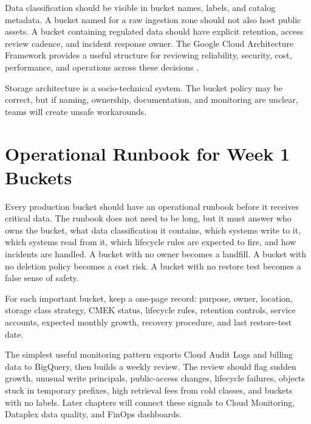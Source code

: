 Data classification should be visible in bucket names, labels, and catalog metadata. A bucket named for a raw ingestion zone should not also host public assets. A bucket containing regulated data should have explicit retention, access review cadence, and incident response owner. The Google Cloud Architecture Framework provides a useful structure for reviewing reliability, security, cost, performance, and operations across these decisions \cite{googlecloudarchitectureframework}.

\begin{notebox}
Storage architecture is a socio-technical system. The bucket policy may be correct, but if naming, ownership, documentation, and monitoring are unclear, teams will create unsafe workarounds.
\end{notebox}

\section{Operational Runbook for Week 1 Buckets}
Every production bucket should have an operational runbook before it receives critical data. The runbook does not need to be long, but it must answer who owns the bucket, what data classification it contains, which systems write to it, which systems read from it, which lifecycle rules are expected to fire, and how incidents are handled. A bucket with no owner becomes a landfill. A bucket with no deletion policy becomes a cost risk. A bucket with no restore test becomes a false sense of safety.

\begin{tipbox}
For each important bucket, keep a one-page record: purpose, owner, location, storage class strategy, CMEK status, lifecycle rules, retention controls, service accounts, expected monthly growth, recovery procedure, and last restore-test date.
\end{tipbox}

The simplest useful monitoring pattern exports Cloud Audit Logs and billing data to BigQuery, then builds a weekly review. The review should flag sudden growth, unusual write principals, public-access changes, lifecycle failures, objects stuck in temporary prefixes, high retrieval fees from cold classes, and buckets with no labels. Later chapters will connect these signals to Cloud Monitoring, Dataplex data quality, and FinOps dashboards.

